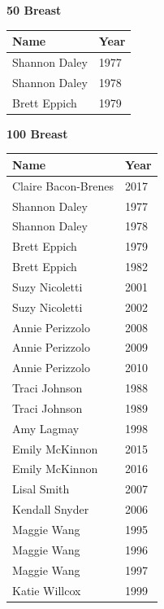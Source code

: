 \vspace{1.2em}
\noindent\begin{minipage}[t]{0.48\textwidth}
\centering
\textbf{\textcolor{teamprimary}{50 Breast}}\par
\vspace{0.5em}
\centering
\small
\renewcommand{\arraystretch}{1.0}
\setlength{\tabcolsep}{4pt}
\begin{tabular}{@{}p{3.0cm}p{1.0cm}@{}}
\toprule
\textbf{Name} & \textbf{Year} \\
\midrule
Shannon Daley & 1977 \\
Shannon Daley & 1978 \\
Brett Eppich & 1979 \\
\bottomrule
\end{tabular}
\end{minipage}
\hfill
\begin{minipage}[t]{0.48\textwidth}
\centering
\textbf{\textcolor{teamprimary}{100 Breast}}\par
\vspace{0.5em}
\centering
\small
\renewcommand{\arraystretch}{1.0}
\setlength{\tabcolsep}{4pt}
\begin{tabular}{@{}p{3.0cm}p{1.0cm}@{}}
\toprule
\textbf{Name} & \textbf{Year} \\
\midrule
Claire Bacon-Brenes & 2017 \\
Shannon Daley & 1977 \\
Shannon Daley & 1978 \\
Brett Eppich & 1979 \\
Brett Eppich & 1982 \\
Suzy Nicoletti & 2001 \\
Suzy Nicoletti & 2002 \\
Annie Perizzolo & 2008 \\
Annie Perizzolo & 2009 \\
Annie Perizzolo & 2010 \\
Traci Johnson & 1988 \\
Traci Johnson & 1989 \\
Amy Lagmay & 1998 \\
Emily McKinnon & 2015 \\
Emily McKinnon & 2016 \\
Lisal Smith & 2007 \\
Kendall Snyder & 2006 \\
Maggie Wang & 1995 \\
Maggie Wang & 1996 \\
Maggie Wang & 1997 \\
Katie Willcox & 1999 \\
\bottomrule
\end{tabular}
\end{minipage}
